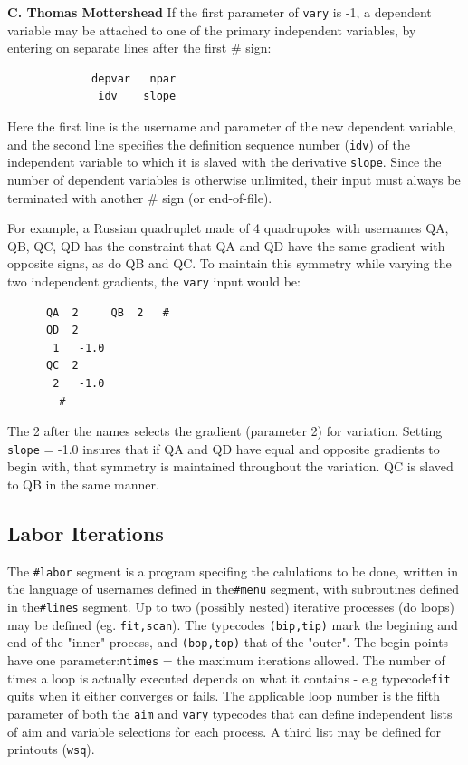 \documentclass[11pt]{article} %
\newcommand{\sub}{\subsection}
\newcommand{\vb}{\verb ;}
\newcommand{\bvb}{\begin{verbatim}}
\newcommand{\benu}{\begin{enumerate}}
\newcommand{\enu}{\end{enumerate}}
\begin{document}
\begin{center}  {\bf C. Thomas Mottershead }
If the first parameter of \vb vary; is -1, a dependent variable may be attached to one of the primary independent variables, by entering on separate lines after the first \# sign:
\bvb
             depvar   npar
              idv    slope
\end{verbatim}
Here the first line is the username and parameter of the new dependent variable, and the second line specifies the definition sequence number (\vb idv;) of the independent variable to which it is slaved with the derivative \vb slope;. Since the number of dependent variables is otherwise unlimited, their input must always be terminated with another \# sign (or end-of-file).


For example, a Russian quadruplet made of 4 quadrupoles with usernames {\sc QA, QB, QC, QD} has the constraint that QA and QD have the same gradient with opposite signs, as do QB and QC. To maintain this symmetry while varying the two independent gradients, the \vb vary; input would be:
\bvb
      QA  2     QB  2   #
      QD  2
       1   -1.0
      QC  2
       2   -1.0
        #
\end{verbatim}
The 2 after the names selects the gradient (parameter 2) for variation. Setting \vb slope; = -1.0 insures that if QA and QD have equal and opposite gradients to begin with, that symmetry is maintained throughout the variation. QC is slaved to QB in the same manner.

\sub{Labor Iterations}
The \vb #labor; segment is a program specifing the calulations to be done, written in the language of usernames defined in the\vb #menu; segment, with subroutines defined in the\vb #lines; segment.   
 Up to two (possibly nested) iterative processes (do loops) may be defined (eg. \vb fit,scan;).
The typecodes \vb(bip,tip); mark the begining and end of the "inner" process, and \vb(bop,top); that of the "outer". The begin points have one parameter:\vb ntimes; = the maximum iterations allowed. The number of times a loop is actually executed depends on what it contains - e.g typecode\vb fit; quits when it either converges or fails. The applicable loop number is the fifth parameter of both the \vb aim; and \vb vary; typecodes that can define independent lists of aim and variable selections for each process. 
A third list may be defined for printouts (\vb wsq;). 






\end{center}
\end{document}
